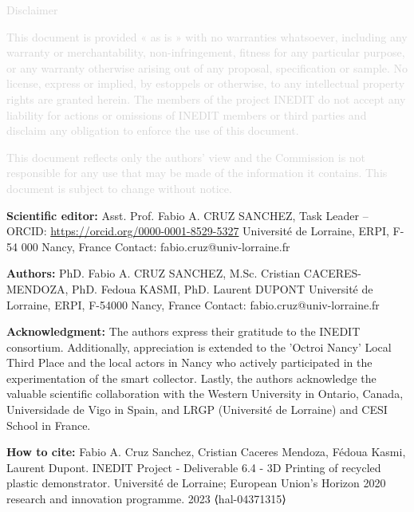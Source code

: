 \vfill

\begin{center}
\textcolor{lightgray}{Disclaimer}

\textcolor{lightgray}{
\small
This document is provided « as is » with no warranties whatsoever, including any warranty or merchantability, non-infringement, fitness for any particular purpose, or any warranty otherwise arising out of any proposal, specification or sample.  No license, express or implied, by estoppels or otherwise, to any intellectual property rights are granted herein. The members of the project INEDIT do not accept any liability for actions or omissions of INEDIT members or third parties and disclaim any obligation to enforce the use of this document. }

\textcolor{lightgray}{
This document reflects only the authors' view and the Commission is not responsible for any use that may be made of the information it contains.  This document is subject to change without notice. 
}
\end{center}
\normalsize


\newpage

\vfill



\textbf{Scientific editor:} \newline
Asst. Prof. Fabio A. CRUZ SANCHEZ, Task Leader – ORCID: \href{https://orcid.org/0000-0001-8529-5327}{https://orcid.org/0000-0001-8529-5327} \newline
Université de Lorraine, ERPI, F-54 000 Nancy, France \newline
Contact: fabio.cruz@univ-lorraine.fr 

\vspace{2cm}

\textbf{Authors:} \newline
PhD. Fabio A. CRUZ SANCHEZ, M.Sc. Cristian CACERES-MENDOZA, PhD. Fedoua KASMI, PhD. Laurent DUPONT \newline
Université de Lorraine, ERPI, F-54000 Nancy, France \newline
Contact: fabio.cruz@univ-lorraine.fr 

\vspace{2cm}

\textbf{Acknowledgment:}\newline
The authors express their gratitude to the INEDIT consortium. 
Additionally, appreciation is extended to the 'Octroi Nancy' Local Third Place and the local actors in Nancy who actively participated in the experimentation of the smart collector. 
Lastly, the authors acknowledge the valuable scientific collaboration with the Western University in Ontario, Canada, 
Universidade de Vigo in Spain, 
and  LRGP (Université de Lorraine) and CESI School in France.
\vspace{2cm}

\textbf{How to cite:} \newline
Fabio A. Cruz Sanchez, Cristian Caceres Mendoza, Fédoua Kasmi, Laurent Dupont. 
INEDIT Project - Deliverable 6.4 - 3D Printing of recycled plastic demonstrator. 
Université de Lorraine; European Union’s Horizon 2020 research and innovation programme. 2023 ⟨hal-04371315⟩


\vfill
\newpage
